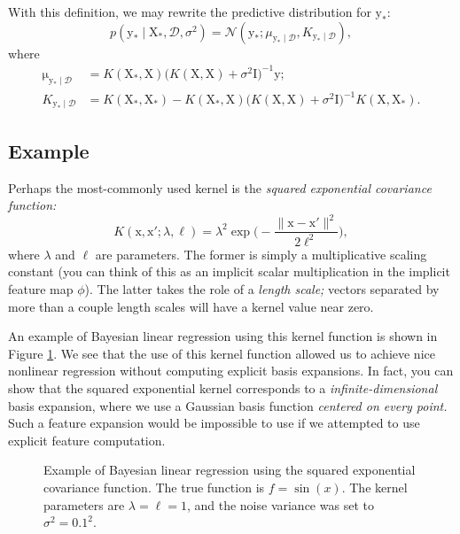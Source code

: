 \documentclass{article}
\newcommand{\given}{\mid}
\newcommand{\mc}[1]{\mathcal{#1}}
\newcommand{\data}{\mc{D}}
\newcommand{\inv}{^{-1}}
\newcommand{\mat}[1]{\bm{\mathrm{#1}}}
\renewcommand{\vec}[1]{\bm{\mathrm{#1}}}
\begin{document}
With this definition, we may rewrite the predictive distribution
for $\vec{y}_\ast$:
\begin{equation*}
  p(\vec{y}_\ast \given \mat{X}_\ast, \data, \sigma^2)
  =
  \mc{N}(
  \vec{y}_\ast;
  \mu_{\vec{y}_\ast \given \data},
  K_{\vec{y}_\ast \given \data}),
\end{equation*}
where
\begin{align*}
  \vec{\mu}_{\vec{y}_\ast\given\data}
  &=
  K(\mat{X}_\ast, \mat{X})
  \bigl(K(\mat{X}, \mat{X}) + \sigma^2 \mat{I}\bigr)\inv
  \vec{y};
  \\
  K_{\vec{y}_\ast\given\data}
  &=
  K(\vec{X}_\ast, \vec{X}_\ast)
  -
  K(\mat{X}_\ast, \mat{X})
  \bigl(K(\mat{X}, \mat{X}) + \sigma^2 \mat{I}\bigr)\inv
  K(\mat{X}, \mat{X}_\ast).
\end{align*}

\subsection*{Example}

Perhaps the most-commonly used kernel is the \emph{squared exponential
  covariance function:}
\begin{equation*}
  K(\vec{x}, \vec{x}'; \lambda, \ell)
  =
  \lambda^2
  \exp\biggl(-\frac{\lVert \vec{x} - \vec{x}' \rVert^2}{2\ell^2}\biggr),
\end{equation*}
where $\lambda$ and $\ell$ are parameters.  The former is simply a
multiplicative scaling constant (you can think of this as an implicit
scalar multiplication in the implicit feature map $\phi$).  The latter
takes the role of a \emph{length scale;} vectors separated by more
than a couple length scales will have a kernel value near zero.

An example of Bayesian linear regression using this kernel function is
shown in Figure \ref{kernel_example}.  We see that the use of this
kernel function allowed us to achieve nice nonlinear regression
without computing explicit basis expansions.  In fact, you can show
that the squared exponential kernel corresponds to a
\emph{infinite-dimensional} basis expansion, where we use a Gaussian
basis function \emph{centered on every point.}  Such a feature
expansion would be impossible to use if we attempted to use explicit
feature computation.

\begin{figure}
  \centering
  
  \caption{Example of Bayesian linear regression using the squared
    exponential covariance function.  The true function is $f =
    \sin(x)$.  The kernel parameters are $\lambda = \ell = 1$, and the
    noise variance was set to $\sigma^2 = 0.1^2$.}
  \label{kernel_example}
\end{figure}
\end{document}

